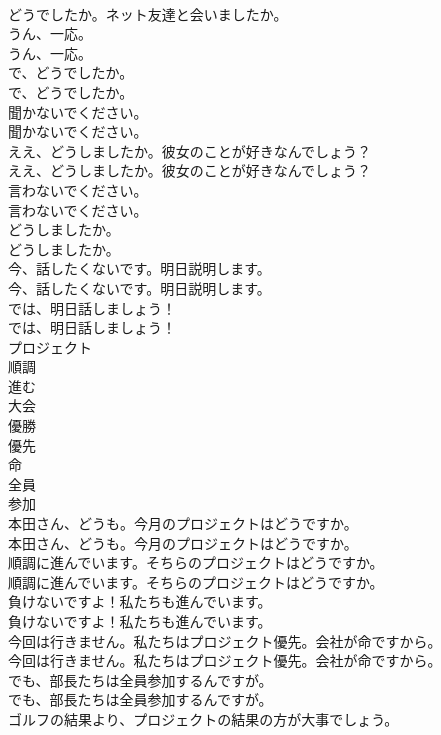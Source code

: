 \documentclass[8pt]{extreport}
\begin{document}
\begin{CJK}{UTF8}{min}
\\	どうでしたか。ネット友達と会いましたか。 
\\	うん、一応。	
\\	うん、一応。 
\\	で、どうでしたか。	
\\	で、どうでしたか。 
\\	聞かないでください。	
\\	聞かないでください。 
\\	ええ、どうしましたか。彼女のことが好きなんでしょう？	
\\	ええ、どうしましたか。彼女のことが好きなんでしょう？ 
\\	言わないでください。	
\\	言わないでください。 
\\	どうしましたか。	
\\	どうしましたか。 
\\	今、話したくないです。明日説明します。	
\\	今、話したくないです。明日説明します。 
\\	では、明日話しましょう！	
\\	では、明日話しましょう！ 
\\	プロジェクト
\\	順調
\\	進む
\\	大会
\\	優勝
\\	優先
\\	命
\\	全員
\\	参加
\\	本田さん、どうも。今月のプロジェクトはどうですか。	
\\	本田さん、どうも。今月のプロジェクトはどうですか。 
\\	順調に進んでいます。そちらのプロジェクトはどうですか。	
\\	順調に進んでいます。そちらのプロジェクトはどうですか。 
\\	負けないですよ！私たちも進んでいます。	
\\	負けないですよ！私たちも進んでいます。 
\\	今回は行きません。私たちはプロジェクト優先。会社が命ですから。	
\\	今回は行きません。私たちはプロジェクト優先。会社が命ですから。 
\\	でも、部長たちは全員参加するんですが。	
\\	でも、部長たちは全員参加するんですが。 
\\	ゴルフの結果より、プロジェクトの結果の方が大事でしょう。	

\end{CJK}
\end{document}
